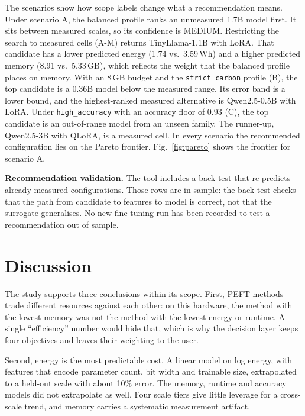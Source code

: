 \documentclass[conference]{IEEEtran}
\begin{document}
The scenarios show how scope labels change what a recommendation means. Under scenario A,
the balanced profile ranks an unmeasured 1.7B model first. It sits between measured scales,
so its confidence is MEDIUM. Restricting the search to measured cells (A-M) returns
TinyLlama-1.1B with LoRA. That candidate has a lower predicted energy (1.74 vs.\ 3.59\,Wh)
and a higher predicted memory (8.91 vs.\ 5.33\,GB), which reflects the weight that the
balanced profile places on memory. With an 8\,GB budget and the \texttt{strict\_carbon}
profile (B), the top candidate is a 0.36B model below the measured range. Its error band is
a lower bound, and the highest-ranked measured alternative is Qwen2.5-0.5B with LoRA. Under
\texttt{high\_accuracy} with an accuracy floor of 0.93 (C), the top candidate is an
out-of-range model from an unseen family. The runner-up, Qwen2.5-3B with QLoRA, is a
measured cell. %
In every scenario the recommended configuration lies on the Pareto frontier.
Fig.~\ref{fig:pareto} shows the frontier for scenario A.

\textbf{Recommendation validation.} The tool includes a back-test that re-predicts already
measured configurations. Those rows are in-sample: the back-test checks that the path from
candidate to features to model is correct, not that the surrogate generalises. No new
fine-tuning run has been recorded to test a recommendation out of sample. %

\section{Discussion}

The study supports three conclusions within its scope. First, PEFT methods trade different
resources against each other: on this hardware, the method with the lowest memory was not the
method with the lowest energy or runtime. A single ``efficiency'' number would hide that,
which is why the decision layer keeps four objectives and leaves their weighting to the user.

Second, energy is the most predictable cost. A linear model on log energy, with features that
encode parameter count, bit width and trainable size, extrapolated to a held-out scale with
about 10\% error. The memory, runtime and accuracy models did not extrapolate as well. Four
scale tiers give little leverage for a cross-scale trend, and memory carries a systematic
measurement artifact.
\end{document}
